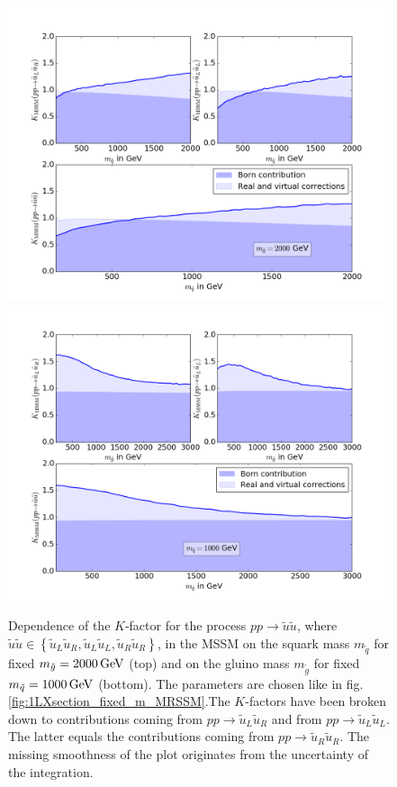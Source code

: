 \begin{figure}[!htpb]
\begin{center}
\includegraphics[scale=.47]{figures/MSSM_uu_susu_Kfactors_msg=2000GeV.png}
\includegraphics[scale=.47]{figures/MSSM_uu_susu_Kfactors_msq=1000GeV.png}
\caption{Dependence of the $K$-factor for the process $pp \to \tilde{u}\tilde{u}$, where $\tilde{u}\tilde{u} \in \left\{ \tilde{u}_L\tilde{u}_R, \tilde{u}_L\tilde{u}_L, \tilde{u}_R\tilde{u}_R \right\}$, in the MSSM on the squark mass $m_{\tilde{q}}$ for fixed $m_{\tilde{g}} = \unit[2000]{GeV}$ (top) and on the gluino mass $m_{\tilde{g}}$ for fixed $m_{\tilde{q}} = \unit[1000]{GeV}$ (bottom). The parameters are chosen like in fig. \ref{fig:1LXsection_fixed_m_MRSSM}.The $K$-factors have been broken down to contributions coming from $pp \to \tilde{u}_L\tilde{u}_R$ and from $pp \to \tilde{u}_L\tilde{u}_L$. The latter equals the contributions coming from $pp \to \tilde{u}_R\tilde{u}_R$. The missing smoothness of the plot originates from the uncertainty of the integration.}\label{fig:1LXsection_fixed_m_MSSM}
\end{center}
\end{figure}
